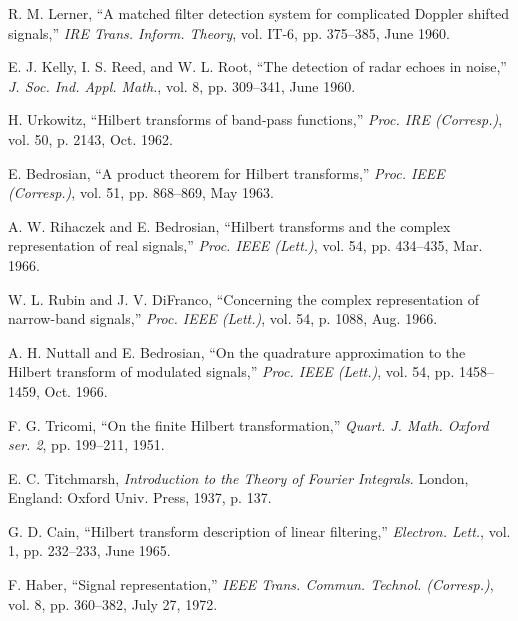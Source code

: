 \documentclass[12pt]{article}
\begin{document}
\begin{thebibliography}{11}
R. M. Lerner, ``A matched filter detection system for complicated Doppler shifted signals,'' \emph{IRE Trans. Inform. Theory}, vol. IT-6, pp. 375--385, June 1960.

E. J. Kelly, I. S. Reed, and W. L. Root, ``The detection of radar echoes in noise,'' \emph{J. Soc. Ind. Appl. Math.}, vol. 8, pp. 309--341, June 1960.

H. Urkowitz, ``Hilbert transforms of band-pass functions,'' \emph{Proc. IRE (Corresp.)}, vol. 50, p. 2143, Oct. 1962.

E. Bedrosian, ``A product theorem for Hilbert transforms,'' \emph{Proc. IEEE (Corresp.)}, vol. 51, pp. 868--869, May 1963.

A. W. Rihaczek and E. Bedrosian, ``Hilbert transforms and the complex representation of real signals,'' \emph{Proc. IEEE (Lett.)}, vol. 54, pp. 434--435, Mar. 1966.

W. L. Rubin and J. V. DiFranco, ``Concerning the complex representation of narrow-band signals,'' \emph{Proc. IEEE (Lett.)}, vol. 54, p. 1088, Aug. 1966.

A. H. Nuttall and E. Bedrosian, ``On the quadrature approximation to the Hilbert transform of modulated signals,'' \emph{Proc. IEEE (Lett.)}, vol. 54, pp. 1458--1459, Oct. 1966.

F. G. Tricomi, ``On the finite Hilbert transformation,'' \emph{Quart. J. Math. Oxford ser. 2}, pp. 199--211, 1951.

E. C. Titchmarsh, \emph{Introduction to the Theory of Fourier Integrals}. London, England: Oxford Univ. Press, 1937, p. 137.

G. D. Cain, ``Hilbert transform description of linear filtering,'' \emph{Electron. Lett.}, vol. 1, pp. 232--233, June 1965.

F. Haber, ``Signal representation,'' \emph{IEEE Trans. Commun. Technol. (Corresp.)}, vol. 8, pp. 360--382, July 27, 1972.
\end{thebibliography}
\end{document}
